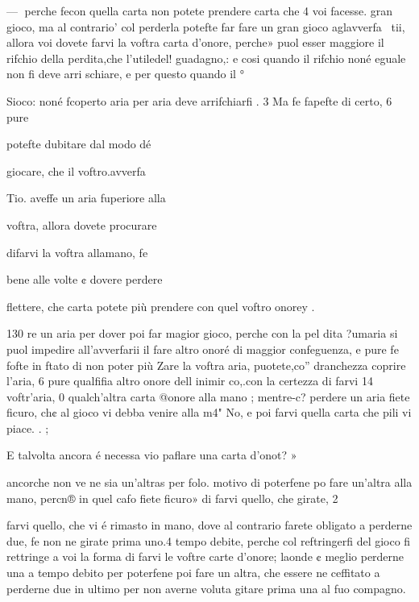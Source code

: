 \documentclass[12pt,a6paper]{article}
\begin{document}
—
perche fecon quella carta non
potete prendere carta che 4 voi
facesse. gran gioco, ma al contrario’ col perderla potefte far
fare un gran gioco aglavverfa~
tii, allora voi dovete farvi la
voftra carta d’onore, perche»
puol esser maggiore il rifchio
della perdita,che l'utiledel! guadagno,: e cosi quando il rifchio
noné eguale non fi deve arri
schiare, e per questo quando il °

Sioco: noné fcoperto aria per
aria deve arrifchiarfi . 3
Ma fe fapefte di certo, 6 pure

potefte dubitare dal modo dé

giocare, che il voftro.avverfa~

Tio. aveffe un aria fuperiore alla

voftra, allora dovete procurare

difarvi la voftra allamano, fe

bene alle volte ¢ dovere perdere

   

flettere, che carta potete più
prendere con quel voftro onorey .
 

 

 

 

 

 

 

130
re un aria per dover poi far magior gioco, perche con la pel
dita ?umaria si puol impedire
all’avverfarii il fare altro onoré
di maggior confeguenza, e pure
fe fofte in ftato di non poter più
Zare la voftra aria, puotete,co”
dranchezza coprire l’aria, 6 pure
qualfifia altro onore dell inimir
co,.con la certezza di farvi 14
voftr’aria, 0 qualch’altra carta
@onore alla mano ; mentre-c?
perdere un aria fiete ficuro, ch¢
al gioco vi debba venire alla m4"
No, e poi farvi quella carta che
pili vi piace. . ;

E talvolta ancora é necessa
vio paflare una carta d’onot? »

ancorche non ve ne sia un’altras
per folo. motivo di poterfene po
fare un’altra alla mano, percn®
in quel cafo fiete ficuro» di
farvi quello, che girate, 2
 

 

farvi quello, che vi é rimasto in
mano, dove al contrario farete
obligato a perderne due, fe non
ne girate prima uno.4 tempo debite, perche col reftringerfi del
gioco fi rettringe a voi la forma
di farvi le voftre carte d’onore;
laonde ¢ meglio perderne una
a tempo debito per poterfene
poi fare un altra, che essere ne
ceffitato a perderne due in ultimo per non averne voluta gitare prima una al fuo compagno.
\end{document}
